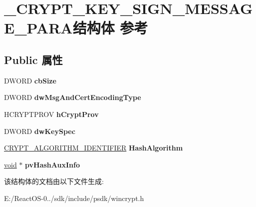 \hypertarget{struct___c_r_y_p_t___k_e_y___s_i_g_n___m_e_s_s_a_g_e___p_a_r_a}{}\section{\+\_\+\+C\+R\+Y\+P\+T\+\_\+\+K\+E\+Y\+\_\+\+S\+I\+G\+N\+\_\+\+M\+E\+S\+S\+A\+G\+E\+\_\+\+P\+A\+R\+A结构体 参考}
\label{struct___c_r_y_p_t___k_e_y___s_i_g_n___m_e_s_s_a_g_e___p_a_r_a}
\subsection*{Public 属性}
\begin{DoxyCompactItemize}
\item 
\mbox{\label{struct___c_r_y_p_t___k_e_y___s_i_g_n___m_e_s_s_a_g_e___p_a_r_a_a3e204f2ea061e7c042323bb2106715d1}} 
D\+W\+O\+RD {\bfseries cb\+Size}
\item 
\mbox{\label{struct___c_r_y_p_t___k_e_y___s_i_g_n___m_e_s_s_a_g_e___p_a_r_a_a13755312f47046688a38a44fe725a504}} 
D\+W\+O\+RD {\bfseries dw\+Msg\+And\+Cert\+Encoding\+Type}
\item 
\mbox{\label{struct___c_r_y_p_t___k_e_y___s_i_g_n___m_e_s_s_a_g_e___p_a_r_a_a4a23a99f5e68cf1a778e3871b17bc682}} 
H\+C\+R\+Y\+P\+T\+P\+R\+OV {\bfseries h\+Crypt\+Prov}
\item 
\mbox{\label{struct___c_r_y_p_t___k_e_y___s_i_g_n___m_e_s_s_a_g_e___p_a_r_a_a8adf506a0596ecee9e4a8535ac1f21f8}} 
D\+W\+O\+RD {\bfseries dw\+Key\+Spec}
\item 
\mbox{\label{struct___c_r_y_p_t___k_e_y___s_i_g_n___m_e_s_s_a_g_e___p_a_r_a_a489fb2d7c46894b03ffa7bd13d279c99}} 
\hyperlink{struct___c_r_y_p_t___a_l_g_o_r_i_t_h_m___i_d_e_n_t_i_f_i_e_r}{C\+R\+Y\+P\+T\+\_\+\+A\+L\+G\+O\+R\+I\+T\+H\+M\+\_\+\+I\+D\+E\+N\+T\+I\+F\+I\+ER} {\bfseries Hash\+Algorithm}
\item 
\mbox{\label{struct___c_r_y_p_t___k_e_y___s_i_g_n___m_e_s_s_a_g_e___p_a_r_a_ae39fba462cea66e92e8c654e2a95d736}} 
\hyperlink{interfacevoid}{void} $\ast$ {\bfseries pv\+Hash\+Aux\+Info}
\end{DoxyCompactItemize}


该结构体的文档由以下文件生成\+:\begin{DoxyCompactItemize}
\item 
E\+:/\+React\+O\+S-\/0../sdk/include/psdk/wincrypt.\+h\end{DoxyCompactItemize}
